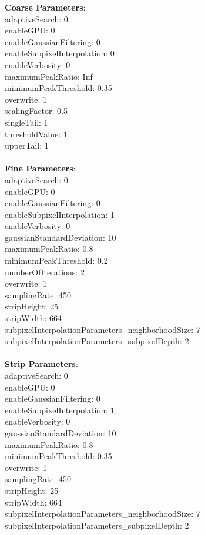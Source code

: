 \documentclass[11pt]{article}
\begin{document}
\textbf{Coarse Parameters}: \\
adaptiveSearch: 0\\
enableGPU: 0\\
enableGaussianFiltering: 0\\
enableSubpixelInterpolation: 0\\
enableVerbosity: 0\\
maximumPeakRatio: Inf\\
minimumPeakThreshold: 0.35\\
overwrite: 1\\
scalingFactor: 0.5\\
singleTail: 1\\
thresholdValue: 1\\
upperTail: 1\\
\\
\textbf{Fine Parameters}: \\
adaptiveSearch: 0\\
enableGPU: 0\\
enableGaussianFiltering: 0\\
enableSubpixelInterpolation: 1\\
enableVerbosity: 0\\
gaussianStandardDeviation: 10\\
maximumPeakRatio: 0.8\\
minimumPeakThreshold: 0.2\\
numberOfIterations: 2\\
overwrite: 1\\
samplingRate: 450\\
stripHeight: 25\\
stripWidth: 664\\
subpixelInterpolationParameters\_neighborhoodSize: 7\\
subpixelInterpolationParameters\_subpixelDepth: 2\\
\\
\textbf{Strip Parameters}: \\
adaptiveSearch: 0\\
enableGPU: 0\\
enableGaussianFiltering: 0\\
enableSubpixelInterpolation: 1\\
enableVerbosity: 0\\
gaussianStandardDeviation: 10\\
maximumPeakRatio: 0.8\\
minimumPeakThreshold: 0.35\\
overwrite: 1\\
samplingRate: 450\\
stripHeight: 25\\
stripWidth: 664\\
subpixelInterpolationParameters\_neighborhoodSize: 7\\
subpixelInterpolationParameters\_subpixelDepth: 2\\
\\
\newpage
\end{document}
